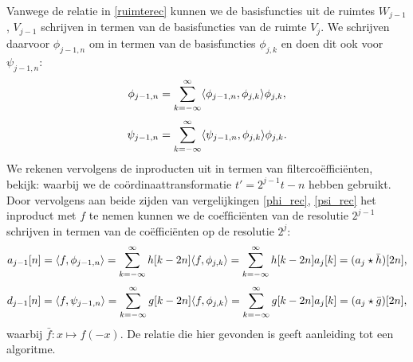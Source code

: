 Vanwege de relatie in \eqref{ruimterec} kunnen we de basisfuncties uit de ruimtes $W_{j-1}$,
$V_{j-1}$ schrijven in termen van de basisfuncties van de ruimte $V_j$.
We schrijven daarvoor $\phi_{j-1,n}$ om in termen van de basisfuncties $\phi_{j,k}$ 
en doen dit ook voor $\psi_{j-1,n}$:
\begin{equation}
  \label{phi_rec}
  \phi_{j-1,n} = \sum_{k=-\infty}^{\infty} \langle \phi_{j-1,n} , \phi_{j,k} \rangle \phi_{j,k},
\end{equation}
\begin{equation}
  \label{psi_rec}
  \psi_{j-1,n} = \sum_{k=-\infty}^{\infty} \langle \psi_{j-1,n} , \phi_{j,k} \rangle \phi_{j,k}.
\end{equation}
We rekenen vervolgens de inproducten uit in termen van filterco\"effici\"enten, bekijk:
waarbij we de co\"ordinaattransformatie $t' = 2^{j-1}t - n$ hebben gebruikt.
Door vervolgens aan beide zijden van vergelijkingen \eqref{phi_rec}, \eqref{psi_rec} het
inproduct met $f$ te nemen kunnen we de coe\"ffici\"enten van de resolutie $2^{j-1}$ schrijven
in termen van de co\"effici\"enten op de resolutie $2^j$:
\begin{equation}
  \label{approx_rec}
  a_{j-1}[n] = \langle f , \phi_{j-1,n} \rangle
  = \sum_{k=-\infty}^{\infty} h[k-2n] \langle f , \phi_{j,k} \rangle
  = \sum_{k=-\infty}^\infty h[k-2n] a_{j}[k]
  = (a_j \star \bar h)[2n],
\end{equation}
\begin{equation}
  \label{detail_rec}
  d_{j-1}[n] = \langle f , \psi_{j-1,n} \rangle
  = \sum_{k=-\infty}^{\infty} g[k-2n] \langle f , \phi_{j,k} \rangle
  = \sum_{k=-\infty}^\infty g[k-2n] a_{j}[k]
  = (a_j \star \bar g)[2n],
\end{equation}
waarbij $\bar f: x \mapsto f(-x)$.
De relatie die hier gevonden is geeft aanleiding tot een algoritme.

